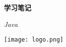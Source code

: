 \begin{titlepage}
    \begin{center}
        \vspace*{1cm}
        \Huge
        \textbf{学习笔记}
        \vspace{0.5cm}

        \vfill
        \large
            \textit{Java}
            \vfill
   
            \vfill
            \texttt{[image: logo.png]}
    \end{center}
\end{titlepage}